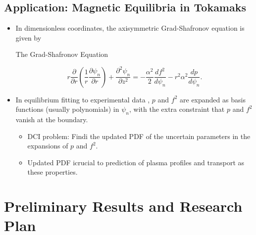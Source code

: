 \documentclass[11pt]{beamer}
\begin{document}
\subsection{Application: Magnetic Equilibria in Tokamaks}

\begin{frame}

	\begin{itemize}
	

	\item In dimensionless coordinates, the axisymmetric  Grad-Shafronov equation is given by
	
	\begin{block}{The Grad-Shafronov Equation \footnotemark[1]}

\begin{equation}
r\frac{\partial}{\partial r} \left( \frac{1}{r} \frac{\partial\psi_n}{\partial r} \right) + \frac{\partial^2 \psi_n}{\partial z^2} = -\frac{\alpha^2}{2} \frac{d f^2}{d \psi_n} - r^2\alpha^2 \frac{dp}{d\psi_n}.
\end{equation}

	\end{block}


	\item In equilibrium fitting to experimental data \footnotemark[2], $p$ and $f^2$ are expanded as basis functions (usually polynomials) in $\psi_n$, with the extra constraint that $p$ and $f^2$ vanish at the boundary.

\begin{itemize}
\item DCI problem: Findi the updated PDF of the uncertain parameters in the expansions of $p$ and $f^2$. 
\item Updated  PDF icrucial to prediction of plasma profiles %
and transport as these properties.

\end{itemize}

\end{itemize}


\end{frame}


\section{Preliminary Results and Research Plan}
\end{document}
